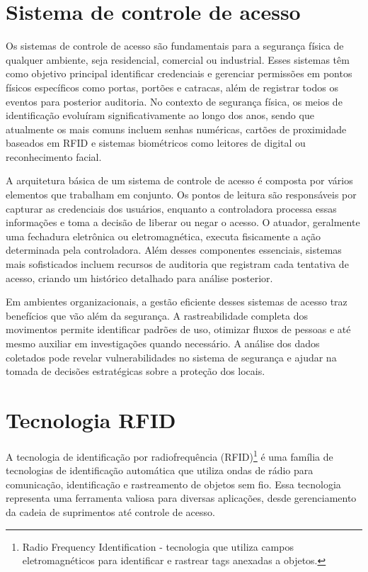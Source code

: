 
\label{Cap:Teoria}


\section{Sistema de controle de acesso}
\label{Sistema de controle de acesso}

Os sistemas de controle de acesso são fundamentais para a segurança física de qualquer ambiente, seja residencial, comercial ou industrial. Esses sistemas têm como objetivo principal identificar credenciais e gerenciar permissões em pontos físicos específicos como portas, portões e catracas, além de registrar todos os eventos para posterior auditoria. No contexto de segurança física, os meios de identificação evoluíram significativamente ao longo dos anos, sendo que atualmente os mais comuns incluem senhas numéricas, cartões de proximidade baseados em RFID e sistemas biométricos como leitores de digital ou reconhecimento facial.

A arquitetura básica de um sistema de controle de acesso é composta por vários elementos que trabalham em conjunto. Os pontos de leitura são responsáveis por capturar as credenciais dos usuários, enquanto a controladora processa essas informações e toma a decisão de liberar ou negar o acesso. O atuador, geralmente uma fechadura eletrônica ou eletromagnética, executa fisicamente a ação determinada pela controladora. Além desses componentes essenciais, sistemas mais sofisticados incluem recursos de auditoria que registram cada tentativa de acesso, criando um histórico detalhado para análise posterior.

Em ambientes organizacionais, a gestão eficiente desses sistemas de acesso traz benefícios que vão além da segurança. A rastreabilidade completa dos movimentos permite identificar padrões de uso, otimizar fluxos de pessoas e até mesmo auxiliar em investigações quando necessário. A análise dos dados coletados pode revelar vulnerabilidades no sistema de segurança e ajudar na tomada de decisões estratégicas sobre a proteção dos locais. 


\section{Tecnologia RFID}
\label{sec:tecnologia-rfid}

A tecnologia de identificação por radiofrequência (RFID)\footnote{Radio Frequency Identification - tecnologia que utiliza campos eletromagnéticos para identificar e rastrear tags anexadas a objetos.} é uma família de tecnologias de identificação automática que utiliza ondas de rádio para comunicação, identificação e rastreamento de objetos sem fio. Essa tecnologia representa uma ferramenta valiosa para diversas aplicações, desde gerenciamento da cadeia de suprimentos até controle de acesso.


